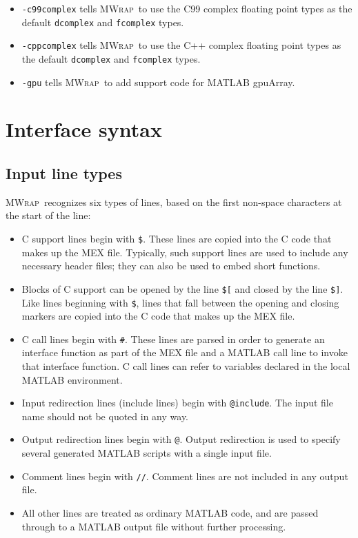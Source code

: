 \documentclass[12pt]{article}
\newcommand{\mwrap}{\textsc{MWrap}}
\begin{document}
\begin{itemize}
\item {\tt -c99complex} tells \mwrap\ to use the C99 complex floating
  point types as the default {\tt dcomplex} and {\tt fcomplex} types.

\item {\tt -cppcomplex} tells \mwrap\ to use the C++ complex floating
  point types as the default {\tt dcomplex} and {\tt fcomplex} types.

\item {\tt -gpu} tells \mwrap\ to add support code for MATLAB gpuArray.

\end{itemize}


\section{Interface syntax}


\subsection{Input line types}

\mwrap\ recognizes six types of lines, based on the first non-space
characters at the start of the line:
\begin{itemize}
\item C support lines begin with \verb|$|.  These
  lines are copied into the C code that makes up the MEX file.
  Typically, such support lines are used to include any necessary
  header files; they can also be used to embed short functions.

\item Blocks of C support can be opened by the line \verb|$[|
  and closed by the line \verb|$]|.  Like lines beginning with \verb|$|,
  lines that fall between the opening and closing markers are copied into
  the C code that makes up the MEX file.

\item C call lines begin with \verb|#|.  These lines are
  parsed in order to generate an interface function as part of the MEX
  file and a MATLAB call line to invoke that interface function.  C
  call lines can refer to variables declared in the local MATLAB
  environment.

\item Input redirection lines (include lines) begin with \verb|@include|.
  The input file name should not be quoted in any way.

\item Output redirection lines begin with \verb|@|. %
  Output redirection is used to specify several generated MATLAB
  scripts with a single input file.

\item Comment lines begin with \verb|//|.  Comment lines are not included
  in any output file.

\item All other lines are treated as ordinary MATLAB code, and are
  passed through to a MATLAB output file without further processing.

\end{itemize}
\end{document}
